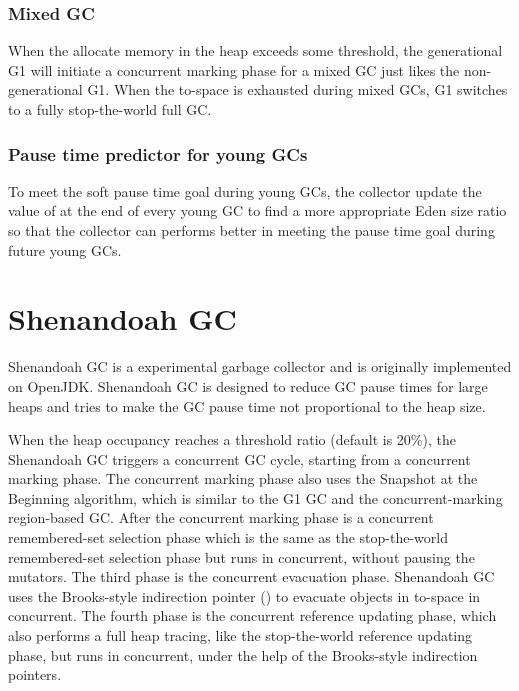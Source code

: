 \subsubsection{Mixed GC}

When the allocate memory in the heap exceeds some threshold, the generational G1 will
initiate a concurrent marking phase for a mixed GC just likes the non-generational G1.
When the to-space is exhausted during mixed GCs, G1 switches to a fully stop-the-world full GC.

\subsubsection{Pause time predictor for young GCs}

To meet the soft pause time goal during young GCs, the collector update the value of 
at the end of every young GC to find a more appropriate Eden size ratio so that
the collector can performs better in meeting the pause time goal during future young GCs.
 
\section{Shenandoah GC}
\label{sec:shenandoahgc}

Shenandoah GC is a experimental garbage collector and is originally implemented on OpenJDK.
Shenandoah GC is designed to reduce GC pause times for large heaps and tries to make the GC pause
time not proportional to the heap size.
 
When the heap occupancy reaches a threshold ratio (default is 20\%), the Shenandoah GC triggers
a concurrent GC cycle, starting from a concurrent marking phase.
The concurrent marking phase also uses the Snapshot at the Beginning algorithm,
which is similar to the G1 GC and the concurrent-marking region-based GC.
After the concurrent marking phase is a concurrent remembered-set selection phase
which is the same as the stop-the-world remembered-set selection phase
but runs in concurrent, without pausing the mutators.
The third phase is the concurrent evacuation phase. Shenandoah GC uses the Brooks-style
indirection pointer (\cite{flood2016shenandoah}) to evacuate objects in to-space
in concurrent. The fourth phase is the concurrent reference updating phase, which
also performs a full heap tracing, like the stop-the-world reference updating phase,
but runs in concurrent, under the help of the Brooks-style indirection pointers.

